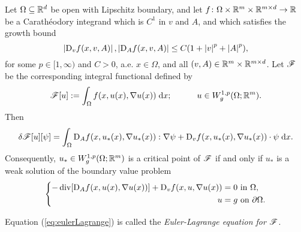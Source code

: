 \begin{theorem}
    Let $\Omega \subseteq \mathbb{R}^d$ be open with Lipschitz boundary, and let $f \colon \Omega \times \mathbb{R}^m \times \mathbb{R}^{m \times d} \to \mathbb{R}$ be a Carath\'eodory integrand which is $C^1$ in $v$ and $A$, and which satisfies the growth bound 
    \begin{equation} \label{eq:eulerLagrangeGrowthBound}
        \left\lvert {\mathrm{D}_v f(x,v,A)} \right\rvert, \left\lvert {\mathrm{D}_A f(x,v,A)} \right\rvert \leq C(1 + \left\lvert {v} \right\rvert^p + \left\lvert {A} \right\rvert^p),
    \end{equation}
    for some $p \in [1,\infty)$ and $C > 0$, a.e. $x \in \Omega$, and all $(v,A) \in \mathbb{R}^m \times \mathbb{R}^{m \times d}$. Let $\mathscr{F}$ be the corresponding integral functional defined by
    \begin{equation}
        \begin{aligned}
            \mathscr{F}[u] := \int_\Omega f(x,u(x),\nabla u(x)) \; \mathrm{d} x; \hspace{30pt} u \in W^{1,p}_g(\Omega;\mathbb{R}^m).
        \end{aligned} 
    \end{equation}
    Then 
    \begin{equation} \label{eq:firstVariationIntegralFormula}
        \delta\mathscr{F}[u][\psi] = \int_\Omega \mathrm{D}_A f(x,u_*(x),\nabla u_*(x)) : \nabla \psi + \mathrm{D}_v f(x,u_*(x),\nabla u_*(x)) \cdot \psi \; \mathrm{d} x.
    \end{equation}
    Consequently, $u_* \in W^{1,p}_g(\Omega;\mathbb{R}^m)$ is a critical point of $\mathscr{F}$ if and only if $u_*$ is a weak solution of the boundary value problem 
    \begin{equation} \label{eq:eulerLagrange}
        \left\{
        \begin{aligned}
            -\operatorname{div}[\mathrm{D}_A f(x,u(x),\nabla u(x))] + \mathrm{D}_v f(x,u,\nabla u(x)) &= 0 \text{ in } \Omega,         \\
                                                                      u &= g \text{ on } \partial\Omega.
        \end{aligned} 
        \right.
    \end{equation}
\end{theorem}
Equation (\ref{eq:eulerLagrange}) is called the \textit{Euler-Lagrange equation for} $\mathscr{F}$.

